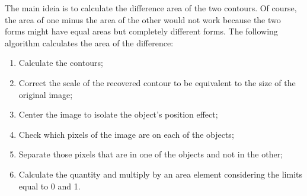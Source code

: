 		The main ideia is to calculate the difference area of the two contours. Of course, the area of one minus the area of the other would not work because the two forms might have equal areas but completely different forms. The following algorithm calculates the area of the difference:
		\begin{enumerate}
			\item Calculate the contours;
			\item Correct the scale of the recovered contour to be equivalent to the size of the original image;
			\item Center the image to isolate the object's position effect;
			\item Check which pixels of the image are on each of the objects;
			\item Separate those pixels that are in one of the objects and not in the other;
			\item Calculate the quantity and multiply by an area element considering the limits equal to 0 and 1.
		\end{enumerate}
		
